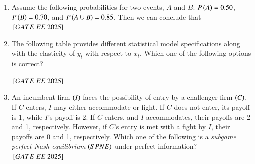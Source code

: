 \documentclass[journal,12pt,onecolumn]{IEEEtran}
\theoremstyle{remark}
\begin{document}
\begin{enumerate}
\item Assume the following probabilities for two events, $A$ and $B$: $P \left(A\right) = 0.50$, $P \left(B\right) = 0.70$, and $P \left(A \cup B\right) = 0.85$. Then we can conclude that
\hfill $\sbrak{GATE\ EE\ 2025}$
\begin{enumerate}
\end{enumerate}
 
\item The following table provides different statistical model specifications along with the elasticity of $y_t$ with respect to $x_t$. Which one of the following options is correct?

\begin{center}

\end{center}
\hfill $\sbrak{GATE\ EE\ 2025}$
\begin{enumerate}
\end{enumerate}
 
\item An incumbent firm $\left(I\right)$ faces the possibility of entry by a challenger firm $\left(C\right)$. If $C$ enters, $I$ may either accommodate or fight. If $C$ does not enter, its payoff is 1, while $I$'s payoff is 2. If $C$ enters, and $I$ accommodates, their payoffs are 2 and 1, respectively. However, if $C$'s entry is met with a fight by $I$, their payoffs are 0 and 1, respectively. Which one of the following is a \textit{subgame perfect Nash equilibrium} $\left(SPNE\right)$ under perfect information?
\hfill $\sbrak{GATE\ EE\ 2025}$
\begin{enumerate}
\end{enumerate}
 

\end{enumerate}
\end{document}
